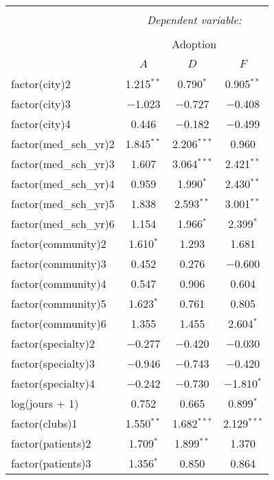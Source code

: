 \documentclass[11pt]{article}
\begin{document}
\begin{table}[!htbp] \centering 
  \caption{} 
  \label{} 
\begin{tabular}{@{\extracolsep{5pt}}lccc} 
\\[-1.8ex]\hline 
\hline \\[-1.8ex] 
 & \multicolumn{3}{c}{\textit{Dependent variable:}} \\ 
\cline{2-4} 
\\[-1.8ex] & \multicolumn{3}{c}{Adoption} \\ 
\\[-1.8ex] & $A$ & $D$ & $F$\\ 
\hline \\[-1.8ex] 
 factor(city)2 & 1.215$^{**}$ & 0.790$^{*}$ & 0.905$^{**}$ \\ 
  factor(city)3 & $-$1.023 & $-$0.727 & $-$0.408 \\ 
  factor(city)4 & 0.446 & $-$0.182 & $-$0.499 \\ 
  factor(med\_sch\_yr)2 & 1.845$^{**}$ & 2.206$^{***}$ & 0.960 \\ 
  factor(med\_sch\_yr)3 & 1.607 & 3.064$^{***}$ & 2.421$^{**}$ \\ 
  factor(med\_sch\_yr)4 & 0.959 & 1.990$^{*}$ & 2.430$^{**}$ \\ 
  factor(med\_sch\_yr)5 & 1.838 & 2.593$^{**}$ & 3.001$^{**}$ \\ 
  factor(med\_sch\_yr)6 & 1.154 & 1.966$^{*}$ & 2.399$^{*}$ \\ 
  factor(community)2 & 1.610$^{*}$ & 1.293 & 1.681 \\ 
  factor(community)3 & 0.452 & 0.276 & $-$0.600 \\ 
  factor(community)4 & 0.547 & 0.906 & 0.604 \\ 
  factor(community)5 & 1.623$^{*}$ & 0.761 & 0.805 \\ 
  factor(community)6 & 1.355 & 1.455 & 2.604$^{*}$ \\ 
  factor(specialty)2 & $-$0.277 & $-$0.420 & $-$0.030 \\ 
  factor(specialty)3 & $-$0.946 & $-$0.743 & $-$0.420 \\ 
  factor(specialty)4 & $-$0.242 & $-$0.730 & $-$1.810$^{*}$ \\ 
  log(jours + 1) & 0.752 & 0.665 & 0.899$^{*}$ \\ 
  factor(clubs)1 & 1.550$^{**}$ & 1.682$^{***}$ & 2.129$^{***}$ \\ 
  factor(patients)2 & 1.709$^{*}$ & 1.899$^{**}$ & 1.370 \\ 
  factor(patients)3 & 1.356$^{*}$ & 0.850 & 0.864 \\ 

\end{tabular}
\end{table}
\end{document}
